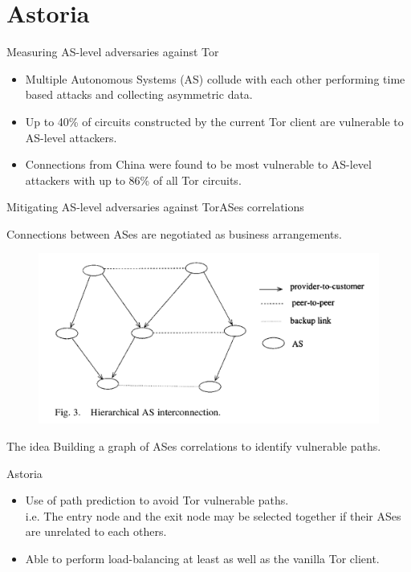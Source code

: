 \section{Astoria}
\begin{frame}{Measuring AS-level adversaries against Tor}
	\begin{itemize}
		\item Multiple Autonomous Systems (AS) collude with each other
	performing time based attacks and collecting asymmetric data.

		\item Up to 40\% of circuits constructed by the current Tor
	client are vulnerable to AS-level attackers.

		\item Connections  from  China  were  found  to  be  most  vulnerable 
	to AS-level attackers with up to 86\% of
	all  Tor  circuits.
	\end{itemize}
\end{frame}


\begin{frame}{Mitigating AS-level adversaries against Tor}{ASes
correlations}

	Connections between ASes are negotiated as business arrangements.
\begin{figure}
			\centering
			\includegraphics[scale=0.18]{imgs/as_graph.png}
		\end{figure}

	\begin{block}{The idea}
		Building a graph of ASes correlations to identify vulnerable
	paths.
	
	\end{block}
\end{frame}

\begin{frame}{Astoria}

	\begin{itemize}
		\item Use of path prediction to avoid Tor vulnerable paths.\\
	i.e. The entry node and the exit node may be selected together if their ASes 
	are unrelated to each others.
		\item Able to perform  load-balancing at least as well as the vanilla Tor
client.
	\end{itemize}

\end{frame}


